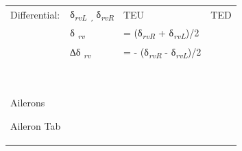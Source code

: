 \documentclass[
]{book}
\begin{document}
\begin{longtable}[]{@{}llll@{}}
\begin{minipage}[t]{0.35\columnwidth}
Differential:\strut
\end{minipage} & \begin{minipage}[t]{0.13\columnwidth}\raggedright
δ\emph{\textsubscript{rvL~,}} δ\emph{\textsubscript{rvR}}\strut
\end{minipage} & \begin{minipage}[t]{0.26\columnwidth}\raggedright
TEU\strut
\end{minipage} & \begin{minipage}[t]{0.14\columnwidth}\raggedright
TED\strut
\end{minipage}\tabularnewline
\begin{minipage}[t]{0.35\columnwidth}\raggedright
\strut
\end{minipage} & \begin{minipage}[t]{0.13\columnwidth}\raggedright
δ \emph{\textsubscript{rv}}\strut
\end{minipage} & \begin{minipage}[t]{0.26\columnwidth}\raggedright
= (δ\emph{\textsubscript{rvR}} + δ\emph{\textsubscript{rvL}})/2\strut
\end{minipage} & \begin{minipage}[t]{0.14\columnwidth}\raggedright
\strut
\end{minipage}\tabularnewline
\begin{minipage}[t]{0.35\columnwidth}\raggedright
\strut
\end{minipage} & \begin{minipage}[t]{0.13\columnwidth}\raggedright
∆δ \emph{\textsubscript{rv}}\strut
\end{minipage} & \begin{minipage}[t]{0.26\columnwidth}\raggedright
= - (δ\emph{\textsubscript{rvR}} - δ\emph{\textsubscript{rvL}})/2\strut
\end{minipage} & \begin{minipage}[t]{0.14\columnwidth}\raggedright
\strut
\end{minipage}\tabularnewline
\begin{minipage}[t]{0.35\columnwidth}\raggedright
~

Ailerons

Aileron Tab


\end{minipage}
\end{longtable}
\end{document}
